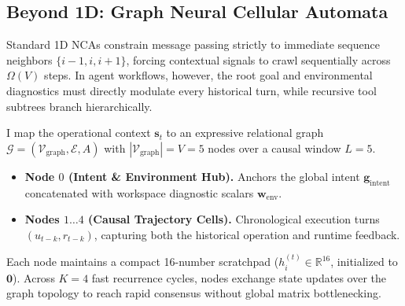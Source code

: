 \documentclass[10pt,twocolumn,letterpaper]{article}
\begin{document}
\subsection{Beyond 1D: Graph Neural Cellular Automata}
Standard 1D NCAs constrain message passing strictly to immediate sequence neighbors $\{i-1, i, i+1\}$, forcing contextual signals to crawl sequentially across $\Omega(V)$ steps. In agent workflows, however, the root goal and environmental diagnostics must directly modulate every historical turn, while recursive tool subtrees branch hierarchically.

I map the operational context $\mathbf{s}_t$ to an expressive relational graph $\mathcal{G} = (\mathcal{V}_{\text{graph}}, \mathcal{E}, A)$ with $|\mathcal{V}_{\text{graph}}| = V = 5$ nodes over a causal window $L=5$.
\begin{itemize}[leftmargin=1.5em, itemsep=0.1em]
  \item \textbf{Node $0$ (Intent \& Environment Hub).} Anchors the global intent $\mathbf{g}_{\text{intent}}$ concatenated with workspace diagnostic scalars $\mathbf{w}_{\text{env}}$.
  \item \textbf{Nodes $1 \dots 4$ (Causal Trajectory Cells).} Chronological execution turns $(u_{t-k}, r_{t-k})$, capturing both the historical operation and runtime feedback.
\end{itemize}
Each node maintains a compact 16-number scratchpad ($h_i^{(t)} \in \mathbb{R}^{16}$, initialized to $\mathbf{0}$). Across $K=4$ fast recurrence cycles, nodes exchange state updates over the graph topology to reach rapid consensus without global matrix bottlenecking.
\end{document}
